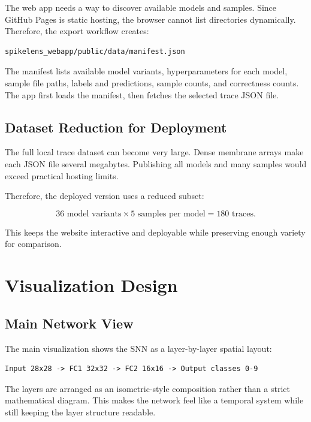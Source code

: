 \documentclass[11pt,a4paper]{article}
\begin{document}
The web app needs a way to discover available models and samples. Since GitHub Pages is static hosting, the browser cannot list directories dynamically. Therefore, the export workflow creates:

\begin{lstlisting}
spikelens_webapp/public/data/manifest.json
\end{lstlisting}

The manifest lists available model variants, hyperparameters for each model, sample file paths, labels and predictions, sample counts, and correctness counts. The app first loads the manifest, then fetches the selected trace JSON file.

\subsection{Dataset Reduction for Deployment}

The full local trace dataset can become very large. Dense membrane arrays make each JSON file several megabytes. Publishing all models and many samples would exceed practical hosting limits.

Therefore, the deployed version uses a reduced subset:

\begin{equation}
36 \text{ model variants} \times 5 \text{ samples per model} = 180 \text{ traces.}
\end{equation}

This keeps the website interactive and deployable while preserving enough variety for comparison.

\section{Visualization Design}

\subsection{Main Network View}

The main visualization shows the SNN as a layer-by-layer spatial layout:

\begin{lstlisting}
Input 28x28 -> FC1 32x32 -> FC2 16x16 -> Output classes 0-9
\end{lstlisting}

The layers are arranged as an isometric-style composition rather than a strict mathematical diagram. This makes the network feel like a temporal system while still keeping the layer structure readable.
\end{document}
